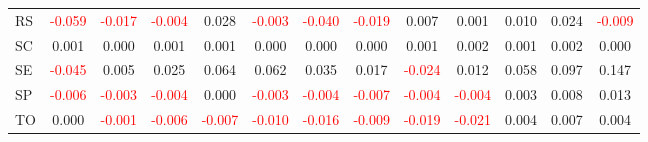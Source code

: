 \documentclass[a4paper, 12pt]{article}
\begin{document}
\begin{table}[H]
{\begin{tabular}{lcccccccccccc}
      RS & \textcolor{red}{-0.059} & \textcolor{red}{-0.017} & \textcolor{red}{-0.004} & 0.028 & \textcolor{red}{-0.003} & \textcolor{red}{-0.040} & \textcolor{red}{-0.019} & 0.007 & 0.001 & 0.010 & 0.024 & \textcolor{red}{-0.009}\\
      SC & 0.001 & 0.000 & 0.001 & 0.001 & 0.000 & 0.000 & 0.000 & 0.001 & 0.002 & 0.001 & 0.002 & 0.000\\
      SE & \textcolor{red}{-0.045} & 0.005 & 0.025 & 0.064 & 0.062 & 0.035 & 0.017 & \textcolor{red}{-0.024} & 0.012 & 0.058 & 0.097 & 0.147\\
      SP & \textcolor{red}{-0.006} & \textcolor{red}{-0.003} & \textcolor{red}{-0.004} & 0.000 & \textcolor{red}{-0.003} & \textcolor{red}{-0.004} & \textcolor{red}{-0.007} & \textcolor{red}{-0.004} & \textcolor{red}{-0.004} & 0.003 & 0.008 & 0.013\\
      TO & 0.000 & \textcolor{red}{-0.001} & \textcolor{red}{-0.006} & \textcolor{red}{-0.007} & \textcolor{red}{-0.010} & \textcolor{red}{-0.016} & \textcolor{red}{-0.009} & \textcolor{red}{-0.019} & \textcolor{red}{-0.021} & 0.004 & 0.007 & 0.004\\
      \hline
    \end{tabular}%
  }
  \label{tab:adm_var_sh}
\end{table}
\end{document}
